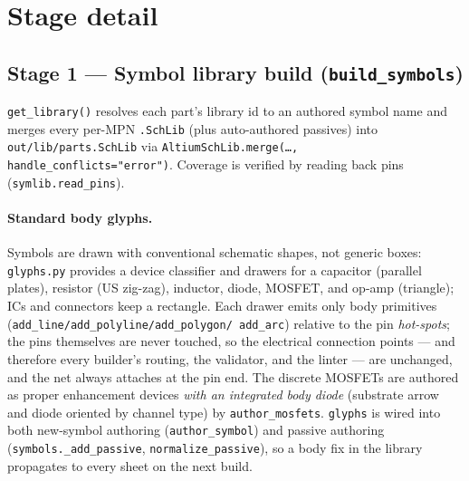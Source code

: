 \documentclass[11pt]{article}
\newcommand{\file}[1]{\texttt{#1}}
\newcommand{\mod}[1]{\texttt{#1}}
\begin{document}
\section{Stage detail}

\subsection{Stage 1 --- Symbol library build (\mod{build\_symbols})}
\mod{get\_library()} resolves each part's library id to an authored symbol name
and merges every per-MPN \file{.SchLib} (plus auto-authored passives) into
\file{out/lib/parts.SchLib} via \texttt{AltiumSchLib.merge(\dots,
handle\_conflicts="error")}. Coverage is verified by reading back pins
(\mod{symlib.read\_pins}).

\paragraph{Standard body glyphs.} Symbols are drawn with conventional schematic
shapes, not generic boxes: \mod{glyphs.py} provides a device classifier and
drawers for a capacitor (parallel plates), resistor (US zig-zag), inductor,
diode, MOSFET, and op-amp (triangle); ICs and connectors keep a rectangle. Each
drawer emits only body primitives (\texttt{add\_line/add\_polyline/add\_polygon/
add\_arc}) relative to the pin \emph{hot-spots}; the pins themselves are never
touched, so the electrical connection points --- and therefore every builder's
routing, the validator, and the linter --- are unchanged, and the net always
attaches at the pin end. The discrete MOSFETs are authored as proper enhancement
devices \emph{with an integrated body diode} (substrate arrow and diode oriented
by channel type) by \mod{author\_mosfets}. \mod{glyphs} is wired into both
new-symbol authoring (\mod{author\_symbol}) and passive authoring
(\mod{symbols.\_add\_passive}, \mod{normalize\_passive}), so a body fix in the
library propagates to every sheet on the next build.
\end{document}
